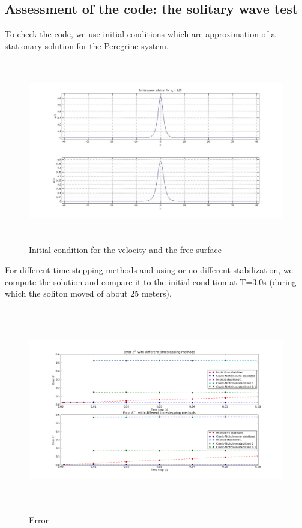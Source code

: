 \documentclass[11pt,a4paper]{article}
\begin{document}
			\pagebreak
			
			\subsection{Assessment of the code: the solitary wave test}	
				To check the code, we use initial conditions which are approximation of a stationary solution for the Peregrine system. 
				\begin{figure}[!h]
					\centering
					\includegraphics[height=8cm]{PeregrineSolitonSolution.jpg}
					\caption{Initial condition for the velocity and the free surface}
				\end{figure}
				
				For different time stepping methods and using or no different stabilization, we compute the solution and compare it to the initial condition at T=3.0s (during which the soliton moved of about 25 meters). 
				\begin{figure}[!h]
				\centering
						\includegraphics[height=9cm]{ErrorL2L801.png}
						\caption{Error}
				\end{figure}
	
\end{document}
